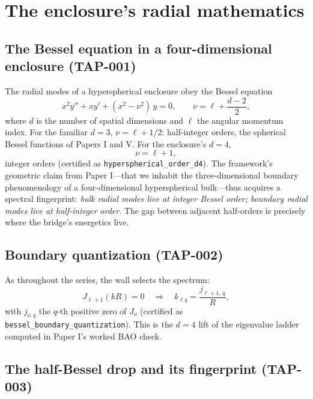 \documentclass[11pt]{article}
\theoremstyle{remark}
\begin{document}
\section{The enclosure's radial mathematics}
\label{sec:bessel}

\subsection{The Bessel equation in a four-dimensional enclosure (TAP-001)}

The radial modes of a hyperspherical enclosure obey the Bessel equation
\begin{equation}
x^2 y'' + x y' + (x^2 - \nu^2)\, y = 0, \qquad \nu = \ell + \frac{d - 2}{2},
\label{eq:besseld}
\end{equation}
where $d$ is the number of spatial dimensions and $\ell$ the angular momentum index. For the familiar $d = 3$, $\nu = \ell + 1/2$: half-integer orders, the spherical Bessel functions of Papers I and V. For the enclosure's $d = 4$,
\begin{equation}
\nu = \ell + 1,
\end{equation}
integer orders (certified as \texttt{hyperspherical\_order\_d4}). The framework's geometric claim from Paper I---that we inhabit the three-dimensional boundary phenomenology of a four-dimensional hyperspherical bulk---thus acquires a spectral fingerprint: \emph{bulk radial modes live at integer Bessel order; boundary radial modes live at half-integer order}. The gap between adjacent half-orders is precisely where the bridge's energetics live.

\subsection{Boundary quantization (TAP-002)}

As throughout the series, the wall selects the spectrum:
\begin{equation}
J_{\ell+1}(kR) = 0 \quad \Longrightarrow \quad k_{\ell q} = \frac{j_{\ell+1,\, q}}{R},
\label{eq:quantization}
\end{equation}
with $j_{\nu,q}$ the $q$-th positive zero of $J_\nu$ (certified as \texttt{bessel\_boundary\_quantization}). This is the $d = 4$ lift of the eigenvalue ladder computed in Paper I's worked BAO check.

\subsection{The half-Bessel drop and its fingerprint (TAP-003)}
\end{document}
